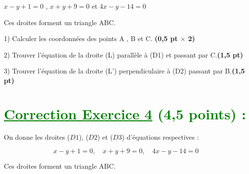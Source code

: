 \documentclass[12pt]{article}
\begin{document}
\( x - y + 1 =0\) ,  \(x + y + 9 = 0\) et  	 \(4x - y - 14 = 0\)

    Ces droites forment un triangle ABC. 
    
    1) Calculer les coordonnées des points A , B et C. \textbf{(0,5 pt $\times$ 2)}
    
    2) Trouver l’équation de la droite (L) parallèle à (D1) et passant par C.\textbf{(1,5 pt)}
    
    3) Trouver l’équation de la droite (L’) perpendiculaire à (D2) passant par B.\textbf{(1,5 pt)}
\section*{\textcolor{green}{\underline{Correction Exercice 4} (4,5 points) :}}

On donne les droites (\(D1\)), (\(D2\)) et (\(D3\)) d’équations respectives :

\[ x - y + 1 = 0, \quad x + y + 9 = 0, \quad 4x - y - 14 = 0 \]

Ces droites forment un triangle ABC. 
\end{document}
